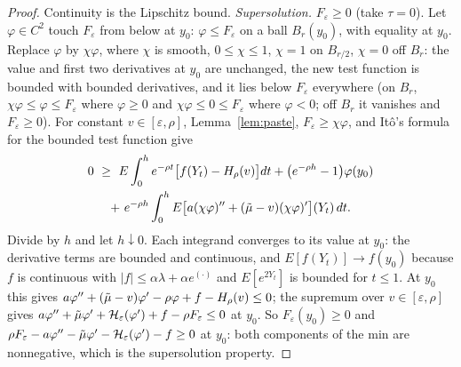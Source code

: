 \begin{proof}
Continuity is the Lipschitz bound. \emph{Supersolution.} $F_\varepsilon\ge0$ (take $\tau=0$). Let $\varphi\in C^2$ touch $F_\varepsilon$ from below at $y_0$: $\varphi\le F_\varepsilon$ on a ball $B_r(y_0)$, with equality at $y_0$. Replace $\varphi$ by $\chi\varphi$, where $\chi$ is smooth, $0\le\chi\le1$, $\chi=1$ on $B_{r/2}$, $\chi=0$ off $B_r$: the value and first two derivatives at $y_0$ are unchanged, the new test function is bounded with bounded derivatives, and it lies below $F_\varepsilon$ everywhere (on $B_r$, $\chi\varphi\le\varphi\le F_\varepsilon$ where $\varphi\ge0$ and $\chi\varphi\le0\le F_\varepsilon$ where $\varphi<0$; off $B_r$ it vanishes and $F_\varepsilon\ge0$). For constant $v\in[\varepsilon,\rho]$, Lemma~\ref{lem:paste}, $F_\varepsilon\ge\chi\varphi$, and It\^o's formula for the bounded test function give
\begin{multline*}
0\ \ge\ E\int_0^h e^{-\rho t}\big[f(Y_t)-H_\rho(v)\big]dt+\big(e^{-\rho h}-1\big)\varphi(y_0)\\
+\ e^{-\rho h}\int_0^h E\big[a(\chi\varphi)''+(\tilde\mu-v)(\chi\varphi)'\big](Y_t)\,dt .
\end{multline*}
Divide by $h$ and let $h\downarrow0$. Each integrand converges to its value at $y_0$: the derivative terms are bounded and continuous, and $E[f(Y_t)]\to f(y_0)$ because $f$ is continuous with $|f|\le\alpha\lambda+\alpha e^{(\cdot)}$ and $E[e^{2Y_t}]$ is bounded for $t\le1$. At $y_0$ this gives $a\varphi''+(\tilde\mu-v)\varphi'-\rho\varphi+f-H_\rho(v)\le0$; the supremum over $v\in[\varepsilon,\rho]$ gives $a\varphi''+\tilde\mu\varphi'+\mathcal H_\varepsilon(\varphi')+f-\rho F_\varepsilon\le0$ at $y_0$. So $F_\varepsilon(y_0)\ge0$ and $\rho F_\varepsilon-a\varphi''-\tilde\mu\varphi'-\mathcal H_\varepsilon(\varphi')-f\ge0$ at $y_0$: both components of the min are nonnegative, which is the supersolution property.


\end{proof}
